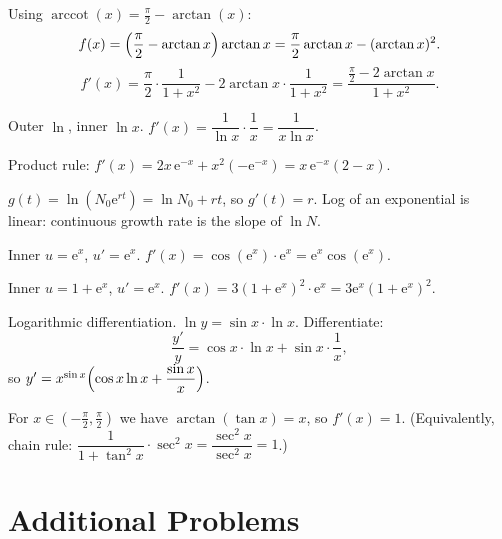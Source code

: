 \begin{solutions}
  \item Using $\operatorname{arccot}(x)=\tfrac{\pi}{2}-\arctan(x)$:
        \[
          f(x)=\Bigl(\frac{\pi}{2}-\arctan x\Bigr)\arctan x
              =\frac{\pi}{2}\arctan x-(\arctan x)^{2} .
        \]
        \[
          f'(x)=\frac{\pi}{2}\cdot\frac{1}{1+x^{2}}
               -2\arctan x\cdot\frac{1}{1+x^{2}}
               =\frac{\frac{\pi}{2}-2\arctan x}{1+x^{2}} .
        \]

  \item Outer $\ln$, inner $\ln x$. $f'(x)=\dfrac{1}{\ln x}\cdot\dfrac{1}{x}
        =\dfrac{1}{x\ln x}$.

  \item Product rule: $f'(x)=2x\,\mathrm{e}^{-x}+x^{2}(-\mathrm{e}^{-x})
        =x\,\mathrm{e}^{-x}(2-x)$.

  \item $g(t)=\ln(N_{0}\mathrm{e}^{rt})=\ln N_{0}+rt$, so $g'(t)=r$. Log
        of an exponential is linear: continuous growth rate is the slope
        of $\ln N$.

  \item Inner $u=\mathrm{e}^{x}$, $u'=\mathrm{e}^{x}$.
        $f'(x)=\cos(\mathrm{e}^{x})\cdot\mathrm{e}^{x}
        =\mathrm{e}^{x}\cos(\mathrm{e}^{x})$.

  \item Inner $u=1+\mathrm{e}^{x}$, $u'=\mathrm{e}^{x}$.
        $f'(x)=3(1+\mathrm{e}^{x})^{2}\cdot\mathrm{e}^{x}
        =3\mathrm{e}^{x}(1+\mathrm{e}^{x})^{2}$.

  \item Logarithmic differentiation. $\ln y=\sin x\cdot\ln x$.
        Differentiate:
        \[
          \frac{y'}{y}=\cos x\cdot\ln x+\sin x\cdot\frac{1}{x},
        \]
        so $y'=x^{\sin x}\Bigl(\cos x\ln x+\dfrac{\sin x}{x}\Bigr)$.

  \item For $x\in(-\tfrac{\pi}{2},\tfrac{\pi}{2})$ we have
        $\arctan(\tan x)=x$, so $f'(x)=1$. (Equivalently, chain rule:
        $\dfrac{1}{1+\tan^{2}x}\cdot\sec^{2}x=\dfrac{\sec^{2}x}{\sec^{2}x}=1$.)
\end{solutions}

\section{Additional Problems}

